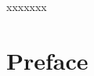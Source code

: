 \begin{frontmatter}
\maketitle





\tableofcontents
\listoffigures
\listoftables

    \newpage
    \begin{inlineabstract}
		\myabstract
		
    \end{inlineabstract}

\begin{acknowledgments}
xxxxxxx
\end{acknowledgments}

\chapter*{Preface}



\end{frontmatter}
